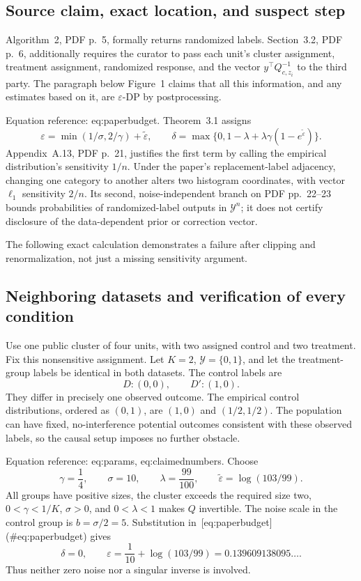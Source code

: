 \documentclass[10pt]{article}
\begin{document}
\subsection*{Source claim, exact location, and suspect step}
Algorithm 2, PDF p. 5, formally returns randomized labels. Section 3.2, PDF p. 6, additionally requires the curator to pass each unit’s cluster assignment, treatment assignment, randomized response, and the vector \(y^\top Q^{-1}_{c,z_i}\) to the third party. The paragraph below Figure 1 claims that all this information, and any estimates based on it, are \(\varepsilon\)-DP by postprocessing.\par
Equation reference: eq:paperbudget. Theorem 3.1 assigns \[
 \varepsilon=\min(1/\sigma,2/\gamma)+\widetilde\varepsilon,
 \qquad
 \delta=\max\{0,1-\lambda+\lambda\gamma(1-e^{\widetilde\varepsilon})\}.\] Appendix A.13, PDF p. 21, justifies the first term by calling the empirical distribution’s sensitivity \(1/n\). Under the paper’s replacement-label adjacency, changing one category to another alters two histogram coordinates, with vector \(\ell_1\) sensitivity \(2/n\). Its second, noise-independent branch on PDF pp. 22–23 bounds probabilities of randomized-label outputs in \(\mathcal Y^n\); it does not certify disclosure of the data-dependent prior or correction vector.\par
The following exact calculation demonstrates a failure after clipping and renormalization, not just a missing sensitivity argument.\par
\subsection*{Neighboring datasets and verification of every condition}
Use one public cluster of four units, with two assigned control and two treatment. Fix this nonsensitive assignment. Let \(K=2\), \(\mathcal Y=\{0,1\}\), and let the treatment-group labels be identical in both datasets. The control labels are \[D:(0,0),\qquad D':(1,0).\] They differ in precisely one observed outcome. The empirical control distributions, ordered as \((0,1)\), are \((1,0)\) and \((1/2,1/2)\). The population can have fixed, no-interference potential outcomes consistent with these observed labels, so the causal setup imposes no further obstacle.\par
Equation reference: eq:params, eq:claimednumbers. Choose \[
 \gamma=\frac14,\qquad \sigma=10,\qquad
 \lambda=\frac{99}{100},\qquad
 \widetilde\varepsilon=\log(103/99).\] All groups have positive sizes, the cluster exceeds the required size two, \(0<\gamma<1/K\), \(\sigma>0\), and \(0<\lambda<1\) makes \(Q\) invertible. The noise scale in the control group is \(b=\sigma/2=5\). Substitution in [eq:paperbudget] (\#eq:paperbudget) gives \[
 \delta=0,\qquad
 \varepsilon=\frac1{10}+\log(103/99)
 =0.139609138095\ldots .\] Thus neither zero noise nor a singular inverse is involved.\par
\end{document}
